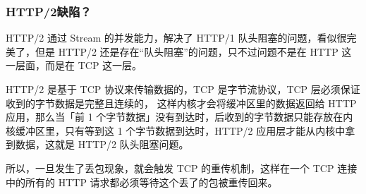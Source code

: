 \documentclass[11pt]{article}
\begin{document}
\subsubsection{HTTP/2缺陷？}
\label{sec:org8732619}
HTTP/2 通过 Stream 的并发能力，解决了 HTTP/1 队头阻塞的问题，看似很完美了，但是 HTTP/2 还是存在“队头阻塞”的问题，只不过问题不是在 HTTP 这一层面，而是在 TCP 这一层。

HTTP/2 是基于 TCP 协议来传输数据的，TCP 是字节流协议，TCP 层必须保证收到的字节数据是完整且连续的，\- 这样内核才会将缓冲区里的数据返回给 HTTP 应用，那么当「前 1 个字节数据」没有到达时，后收到的字节数据只能存放在内核缓冲区里，只有等到这 1 个字节数据到达时，HTTP/2 应用层才能从内核中拿到数据，这就是 HTTP/2 队头阻塞问题。

所以，一旦发生了丢包现象，就会触发 TCP 的重传机制，这样在一个 TCP 连接中的所有的 HTTP 请求都必须等待这个丢了的包被重传回来。
\end{document}
